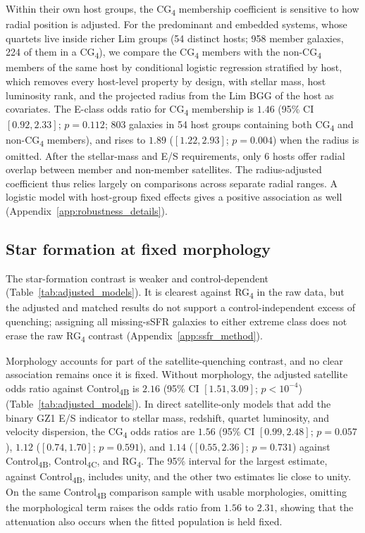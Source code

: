 \documentclass{aa}
\newcommand{\CB}{Control\textsubscript{4B}}
\newcommand{\CC}{Control\textsubscript{4C}}
\newcommand{\CG}{CG\textsubscript{4}}
\newcommand{\RG}{RG\textsubscript{4}}
\begin{document}
Within their own host groups, the \CG{} membership coefficient is sensitive to how radial position is adjusted. For the \nGrPre{} predominant and \nGrEmb{} embedded systems, whose quartets live inside richer Lim groups (54 distinct hosts; 958 member galaxies, 224 of them in a \CG{}), we compare the \CG{} members with the non-\CG{} members of the same host by conditional logistic regression stratified by host, which removes every host-level property by design, with stellar mass, host luminosity rank, and the projected radius from the Lim BGG of the host as covariates. The E-class odds ratio for \CG{} membership is \(1.46\) (95\% CI \([0.92, 2.33]\); \(p = 0.112\); 803 galaxies in 54 host groups containing both \CG{} and non-\CG{} members), and rises to \(1.89\) (\([1.22, 2.93]\); \(p = 0.004\)) when the radius is omitted. After the stellar-mass and E/S requirements, only 6 hosts offer radial overlap between member and non-member satellites. The radius-adjusted coefficient thus relies largely on comparisons across separate radial ranges. A logistic model with host-group fixed effects gives a positive association as well (Appendix~\ref{app:robustness_details}).


\subsection{Star formation at fixed morphology}\label{sec:star_formation}

The star-formation contrast is weaker and control-dependent (Table~\ref{tab:adjusted_models}). It is clearest against \RG{} in the raw data, but the adjusted and matched results do not support a control-independent excess of quenching; assigning all missing-sSFR galaxies to either extreme class does not erase the raw \RG{} contrast (Appendix~\ref{app:ssfr_method}).





Morphology accounts for part of the satellite-quenching contrast, and no clear association remains once it is fixed. Without morphology, the adjusted satellite odds ratio against \CB{} is \(2.16\) (95\% CI \([1.51, 3.09]\); \(p<10^{-4}\)) (Table~\ref{tab:adjusted_models}). In direct satellite-only models that add the binary GZ1 E/S indicator to stellar mass, redshift, quartet luminosity, and velocity dispersion, the \CG{} odds ratios are \(1.56\) (95\% CI \([0.99, 2.48]\); \(p = 0.057\)), \(1.12\) (\([0.74, 1.70]\); \(p = 0.591\)), and \(1.14\) (\([0.55, 2.36]\); \(p = 0.731\)) against \CB{}, \CC{}, and \RG{}. The 95\% interval for the largest estimate, against \CB{}, includes unity, and the other two estimates lie close to unity. On the same \CB{} comparison sample with usable morphologies, omitting the morphological term raises the odds ratio from \(1.56\) to \(2.31\), showing that the attenuation also occurs when the fitted population is held fixed.
\end{document}
